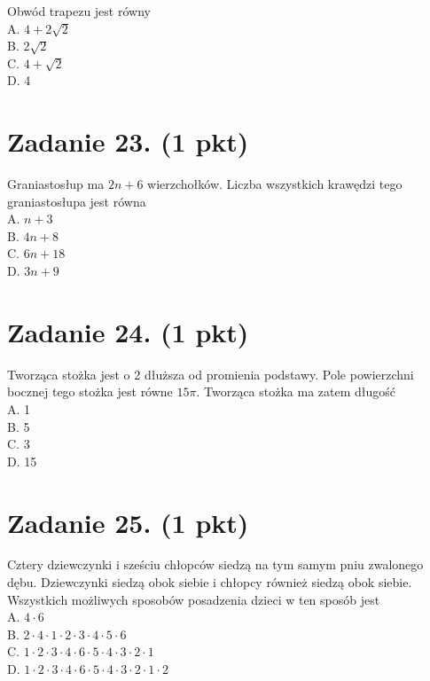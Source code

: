 \documentclass[10pt]{article}
\begin{document}
Obwód trapezu jest równy\\
A. \(4+2 \sqrt{2}\)\\
B. \(2 \sqrt{2}\)\\
C. \(4+\sqrt{2}\)\\
D. 4

\section*{Zadanie 23. (1 pkt)}
Graniastosłup ma \(2 n+6\) wierzchołków. Liczba wszystkich krawędzi tego graniastosłupa jest równa\\
A. \(n+3\)\\
B. \(4 n+8\)\\
C. \(6 n+18\)\\
D. \(3 n+9\)

\section*{Zadanie 24. (1 pkt)}
Tworząca stożka jest o 2 dłuższa od promienia podstawy. Pole powierzchni bocznej tego stożka jest równe \(15 \pi\). Tworząca stożka ma zatem długość\\
A. 1\\
B. 5\\
C. 3\\
D. 15

\section*{Zadanie 25. (1 pkt)}
Cztery dziewczynki i sześciu chłopców siedzą na tym samym pniu zwalonego dębu. Dziewczynki siedzą obok siebie i chłopcy również siedzą obok siebie. Wszystkich możliwych sposobów posadzenia dzieci w ten sposób jest\\
A. \(4 \cdot 6\)\\
B. \(2 \cdot 4 \cdot 1 \cdot 2 \cdot 3 \cdot 4 \cdot 5 \cdot 6\)\\
C. \(1 \cdot 2 \cdot 3 \cdot 4 \cdot 6 \cdot 5 \cdot 4 \cdot 3 \cdot 2 \cdot 1\)\\
D. \(1 \cdot 2 \cdot 3 \cdot 4 \cdot 6 \cdot 5 \cdot 4 \cdot 3 \cdot 2 \cdot 1 \cdot 2\)
\end{document}
